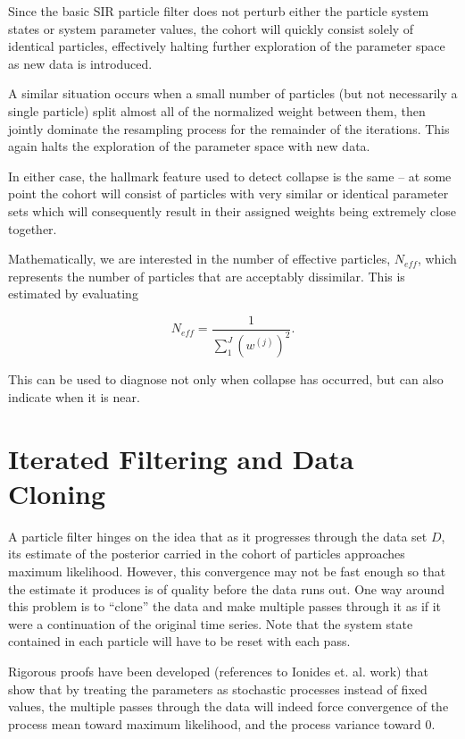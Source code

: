 	Since the basic SIR particle filter does not perturb either the particle system states or system parameter values, the cohort will quickly consist solely of identical particles, effectively halting further exploration of the parameter space as new data is introduced.

	A similar situation occurs when a small number of particles (but not necessarily a single particle) split almost all of the normalized weight between them, then jointly dominate the resampling process for the remainder of the iterations. This again halts the exploration of the parameter space with new data.

	In either case, the hallmark feature used to detect collapse is the same -- at some point the cohort will consist of particles with very similar or identical parameter sets which will consequently result in their assigned weights being extremely close together.

	Mathematically, we are interested in the number of effective particles, $N_{eff}$, which represents the number of particles that are acceptably dissimilar. This is estimated by evaluating

	\begin{equation}
		N_{eff} = \frac{1}{\sum_1^J (w^{(j)})^2}.
	\end{equation}

	This can be used to diagnose not only when collapse has occurred, but can also indicate when it is near.


\section{Iterated Filtering and Data Cloning}

	A particle filter hinges on the idea that as it progresses through the data set $D$, its estimate of the posterior carried in the cohort of particles approaches maximum likelihood. However, this convergence may not be fast enough so that the estimate it produces is of quality before the data runs out. One way around this problem is to ``clone'' the data and make multiple passes through it as if it were a continuation of the original time series. Note that the system state contained in each particle will have to be reset with each pass.

	Rigorous proofs have been developed (references to Ionides et. al. work) that show that by treating the parameters as stochastic processes instead of fixed values, the multiple passes through the data will indeed force convergence of the process mean toward maximum likelihood, and the process variance toward 0.


